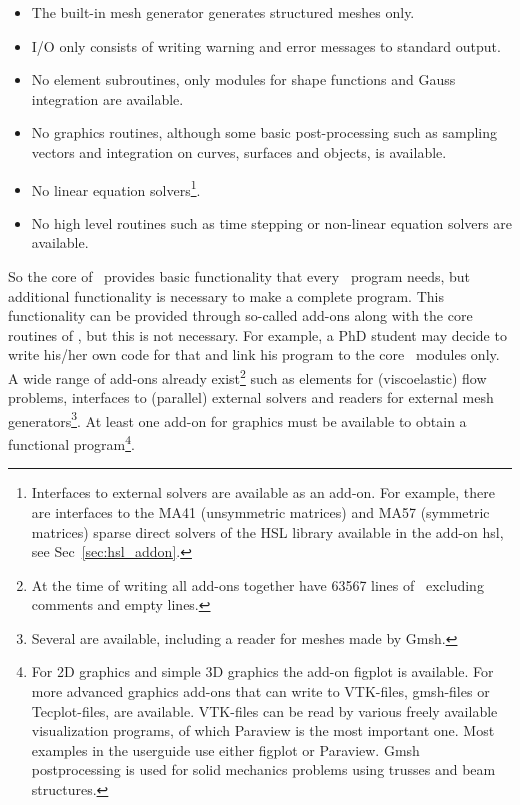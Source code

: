\begin{itemize}
   \item The built-in mesh generator generates structured meshes only.
   \item I/O only consists of writing warning and error messages to standard
         output.
   \item No element subroutines, only modules for
         shape functions and Gauss integration are available.
   \item No graphics routines, although some basic post-processing such as
         sampling vectors and integration
         on curves, surfaces and objects, is available.
   \item No linear equation solvers\footnote{Interfaces to external solvers are available 
         as an add-on. For example, 
   there are interfaces to the MA41 (unsymmetric
         matrices) and MA57 (symmetric matrices) sparse direct solvers
         of the HSL library \cite{HSL} available in the add-on hsl, see Sec~\ref{sec:hsl_addon}.}.
   \item No high level routines such as time stepping or
         non-linear equation solvers are available.
\end{itemize}
So the core of
\tfem\ provides basic functionality that every \fem\ program needs, but
additional functionality is necessary to make a complete program. This
functionality can be provided through so-called add-ons along with the core 
routines of \tfem, but this is not necessary.
For example, a PhD student may decide to write his/her own code for that and
link his program to the core \tfem\ modules only. A wide range of 
add-ons already exist\footnote{At the time
 of writing all add-ons together have 63567
lines of \ftn\, excluding comments and empty lines.}
such as elements for (viscoelastic) flow problems, interfaces
to (parallel) external solvers and
readers for external mesh generators\footnote{Several are available, including a reader for meshes made by
Gmsh.}.
At least one add-on for graphics must be available to obtain a functional
program\footnote{For 2D graphics and simple 3D graphics the add-on figplot
is available.
For more advanced graphics add-ons that can write to 
VTK-files, gmsh-files or Tecplot-files, are available.
VTK-files can be read by various freely available
visualization programs, of which Paraview is the most important one.
Most examples in the userguide use either figplot or Paraview. Gmsh postprocessing is used for solid mechanics problems using trusses and beam structures.}.

